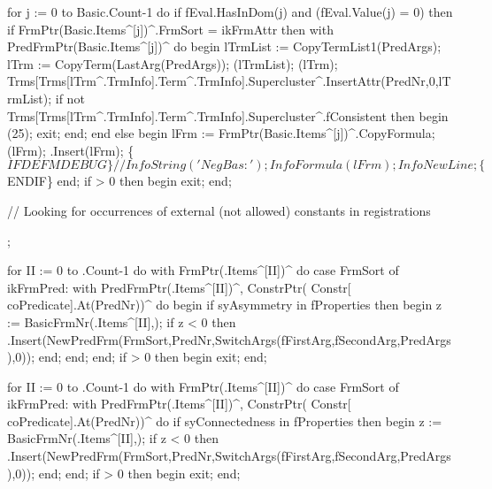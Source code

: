    for j := 0 to Basic.Count-1 do
      if fEval.HasInDom(j) and (fEval.Value(j) = 0) then
         if FrmPtr(Basic.Items^[j])^.FrmSort  = ikFrmAttr then
            with PredFrmPtr(Basic.Items^[j])^ do
         begin
            lTrmList := CopyTermList1(PredArgs);
            lTrm := CopyTerm(LastArg(PredArgs));
            (lTrmList);
            (lTrm);
            Trms[Trms[lTrm^.TrmInfo].Term^.TrmInfo].Supercluster^.InsertAttr(PredNr,0,lTrmList);
            if not Trms[Trms[lTrm^.TrmInfo].Term^.TrmInfo].Supercluster^.fConsistent then
            begin
               (25);
               exit;
            end;
         end
         else
         begin
            lFrm := FrmPtr(Basic.Items^[j])^.CopyFormula;
            (lFrm);
            .Insert(lFrm);
            \{$IFDEF MDEBUG\}
            // InfoString('NegBas: '); InfoFormula(lFrm); InfoNewLine;
            \{$ENDIF\}
         end;
   if  > 0 then
   begin
      exit;
   end;
   
   // Looking for occurrences of external (not allowed) constants in registrations
   
   ;
   
   for II := 0 to .Count-1 do
      with FrmPtr(.Items^[II])^ do
         case FrmSort of
            ikFrmPred:
               with PredFrmPtr(.Items^[II])^,
            ConstrPtr( Constr[ coPredicate].At(PredNr))^ do
            begin
               if syAsymmetry in fProperties then
               begin
                  z := BasicFrmNr(.Items^[II],);
                  if z < 0 then
                     .Insert(NewPredFrm(FrmSort,PredNr,SwitchArgs(fFirstArg,fSecondArg,PredArgs),0));
               end;
            end;
         end;
   if  > 0 then
   begin
      exit;
   end;
   
   for II := 0 to .Count-1 do
      with FrmPtr(.Items^[II])^ do
         case FrmSort of
            ikFrmPred:
               with PredFrmPtr(.Items^[II])^,
            ConstrPtr( Constr[ coPredicate].At(PredNr))^ do
               if syConnectedness in fProperties then
               begin
                  z := BasicFrmNr(.Items^[II],);
                  if z < 0 then
                     .Insert(NewPredFrm(FrmSort,PredNr,SwitchArgs(fFirstArg,fSecondArg,PredArgs),0));
               end;
         end;
   if  > 0 then
   begin
      exit;
   end;
   
